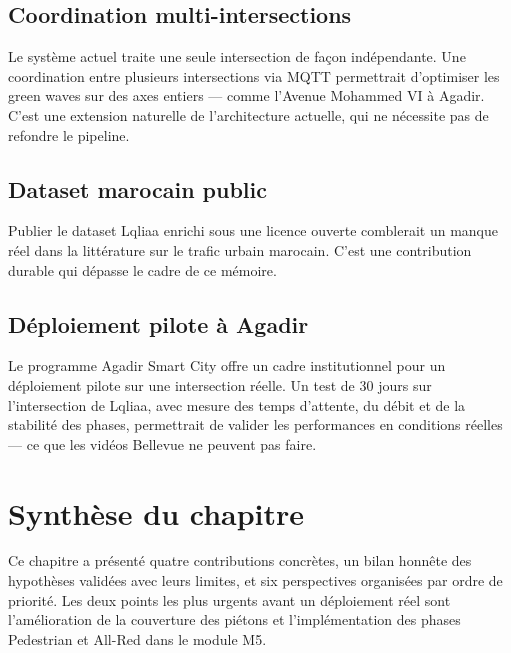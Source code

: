 \subsection{Coordination multi-intersections}

Le système actuel traite une seule
intersection de façon indépendante.
Une coordination entre plusieurs
intersections via MQTT permettrait
d'optimiser les green waves sur des
axes entiers — comme l'Avenue Mohammed VI
à Agadir. C'est une extension naturelle
de l'architecture actuelle, qui ne
nécessite pas de refondre le pipeline.

\subsection{Dataset marocain public}

Publier le dataset Lqliaa enrichi sous
une licence ouverte comblerait un manque
réel dans la littérature sur le trafic
urbain marocain. C'est une contribution
durable qui dépasse le cadre de ce
mémoire.

\subsection{Déploiement pilote à Agadir}

Le programme Agadir Smart City offre
un cadre institutionnel pour un
déploiement pilote sur une intersection
réelle. Un test de 30 jours sur
l'intersection de Lqliaa, avec mesure
des temps d'attente, du débit et de la
stabilité des phases, permettrait de
valider les performances en conditions
réelles — ce que les vidéos Bellevue ne
peuvent pas faire.

\section*{Synthèse du chapitre}

Ce chapitre a présenté quatre contributions
concrètes, un bilan honnête des hypothèses
validées avec leurs limites, et six
perspectives organisées par ordre de
priorité. Les deux points les plus
urgents avant un déploiement réel sont
l'amélioration de la couverture des
piétons et l'implémentation des phases
Pedestrian et All-Red dans le module M5.